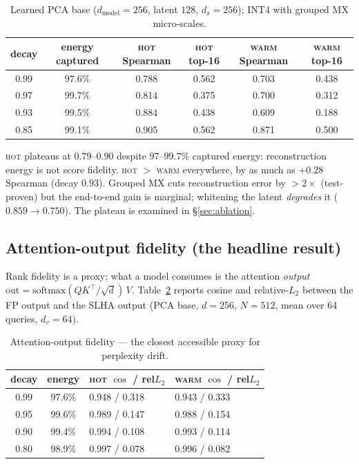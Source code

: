 \documentclass[11pt]{article}
\theoremstyle{plain}
\theoremstyle{definition}
\newcommand{\ds}{d_s}
\begin{document}
\begin{table}[t]
\centering
\caption{Learned PCA base ($d_{\text{model}}=256$, latent $128$,
$\ds=256$); INT4 with grouped MX micro-scales.}
\label{tab:pca}
\small
\begin{tabular}{@{}cccccc@{}}
\toprule
decay & energy captured & \textsc{hot} Spearman & \textsc{hot} top-16 & \textsc{warm} Spearman & \textsc{warm} top-16 \\
\midrule
0.99 & 97.6\% & 0.788 & 0.562 & 0.703 & 0.438 \\
0.97 & 99.7\% & 0.814 & 0.375 & 0.700 & 0.312 \\
0.93 & 99.5\% & 0.884 & 0.438 & 0.609 & 0.188 \\
0.85 & 99.1\% & 0.905 & 0.562 & 0.871 & 0.500 \\
\bottomrule
\end{tabular}
\end{table}

\textsc{hot} plateaus at $0.79$--$0.90$ despite $97$--$99.7\%$ captured
energy: reconstruction energy is not score fidelity. \textsc{hot} $>$
\textsc{warm} everywhere, by as much as $+0.28$ Spearman (decay $0.93$).
Grouped MX cuts reconstruction error by $>2\times$ (test-proven) but the
end-to-end gain is marginal; whitening the latent \emph{degrades} it
($0.859 \to 0.750$). The plateau is examined in \S\ref{sec:ablation}.

\subsection{Attention-output fidelity (the headline result)}
\label{sec:output}
Rank fidelity is a proxy; what a model consumes is the attention
\emph{output} $\mathrm{out} = \mathrm{softmax}(QK^\top/\sqrt{d})\,V$.
Table~\ref{tab:output} reports cosine and relative-$L_2$ between the FP
output and the SLHA output (PCA base, $d=256$, $N=512$, mean over 64
queries, $d_v=64$).

\begin{table}[t]
\centering
\caption{Attention-output fidelity --- the closest accessible proxy for
perplexity drift.}
\label{tab:output}
\small
\begin{tabular}{@{}ccll@{}}
\toprule
decay & energy & \textsc{hot} $\cos$ / rel$L_2$ & \textsc{warm} $\cos$ / rel$L_2$ \\
\midrule
0.99 & 97.6\% & 0.948 / 0.318 & 0.943 / 0.333 \\
0.95 & 99.6\% & 0.989 / 0.147 & 0.988 / 0.154 \\
0.90 & 99.4\% & 0.994 / 0.108 & 0.993 / 0.114 \\
0.80 & 98.9\% & 0.997 / 0.078 & 0.996 / 0.082 \\
\bottomrule
\end{tabular}
\end{table}
\end{document}
